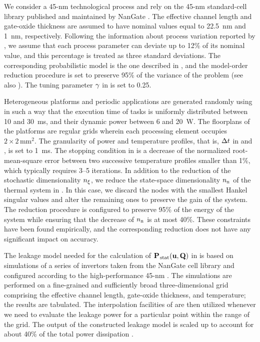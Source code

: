 We consider a 45-nm technological process and rely on the 45-nm standard-cell library published and maintained by NanGate \cite{nangate}.
The effective channel length and gate-oxide thickness are assumed to have nominal values equal to 22.5~nm and 1~nm, respectively.
Following the information about process variation reported by  \cite{itrs}, we assume that each process parameter can deviate up to 12\% of its nominal value, and this percentage is treated as three standard deviations.
The corresponding probabilistic model is the one described in , and the model-order reduction procedure is set to preserve 95\% of the variance of the problem (see also ).
The tuning parameter $\gamma$ in  is set to 0.25.

Heterogeneous platforms and periodic applications are generated randomly using  \cite{dick1998} in such a way that the execution time of tasks is uniformly distributed between 10 and 30~ms, and their dynamic power between 6 and 20~W.
The floorplans of the platforms are regular grids wherein each processing element occupies $2 \times 2\,\text{mm}^2$.
The granularity of power and temperature profiles, that is, $\Delta t$ in  and , is set to 1~ms.
The stopping condition in  is a decrease of the normalized root-mean-square error between two successive temperature profiles smaller than 1\%, which typically requires 3--5 iterations.
In addition to the reduction of the stochastic dimensionality ${n_\xi}$, we reduce the state-space dimensionality ${n_\text{n}}$ of the thermal system in .
In this case, we discard the nodes with the smallest Hankel singular values and alter the remaining ones to preserve the  gain of the system.
The reduction procedure is configured to preserve 95\% of the energy of the system while ensuring that the decrease of ${n_\text{n}}$ is at most 40\%.
These constraints have been found empirically, and the corresponding reduction does not have any significant impact on accuracy.

The leakage model needed for the calculation of $\mathbf{P}_{\text{\kern0.1emstat}}(\mathbf{u}, \mathbf{Q})$ in  is based on  simulations of a series of  invertors taken from the NanGate cell library and configured according to the high-performance 45-nm  \cite{ptm}.
The simulations are performed on a fine-grained and sufficiently broad three-dimensional grid comprising the effective channel length, gate-oxide thickness, and temperature; the results are tabulated.
The interpolation facilities of  \cite{matlab} are then utilized whenever we need to evaluate the leakage power for a particular point within the range of the grid.
The output of the constructed leakage model is scaled up to account for about 40\% of the total power dissipation \cite{liu2007}.

